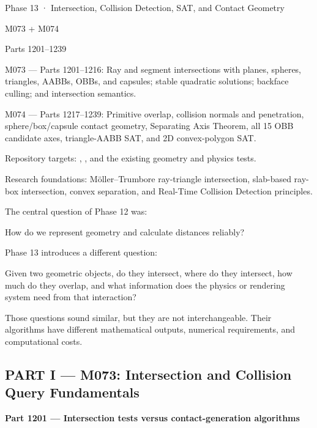 Phase 13 · Intersection, Collision Detection, SAT, and Contact Geometry

M073 + M074

Parts 1201--1239

M073 --- Parts 1201--1216: Ray and segment intersections with planes, spheres, triangles, AABBs, OBBs, and capsules; stable quadratic solutions; backface culling; and intersection semantics.

M074 --- Parts 1217--1239: Primitive overlap, collision normals and penetration, sphere/box/capsule contact geometry, Separating Axis Theorem, all 15 OBB candidate axes, triangle-AABB SAT, and 2D convex-polygon SAT.

Repository targets: , , and the existing geometry and physics tests.

Research foundations: Möller--Trumbore ray-triangle intersection, slab-based ray-box intersection, convex separation, and Real-Time Collision Detection principles.

The central question of Phase 12 was:

How do we represent geometry and calculate distances reliably?

Phase 13 introduces a different question:

Given two geometric objects, do they intersect, where do they intersect, how much do they overlap, and what information does the physics or rendering system need from that interaction?

Those questions sound similar, but they are not interchangeable. Their algorithms have different mathematical outputs, numerical requirements, and computational costs.

\subsection{PART I --- M073: Intersection and Collision Query Fundamentals}\label{04-visual-computing-ii-ch023-part-i-m073-intersection-and-collision-query-fundamentals}

\hypertarget{04-visual-computing-ii-ch023-part-i-m073-intersection-and-collision-query-fundamentals}{}

\textbf{Part 1201 --- Intersection tests versus contact-generation algorithms}


